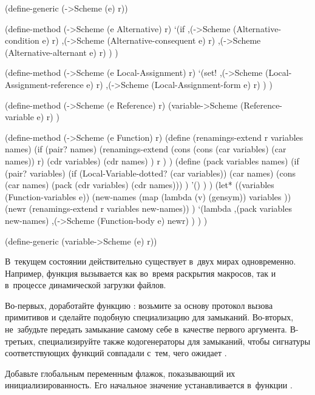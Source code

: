 \begin{code:lisp}
(define-generic (->Scheme (e) r))

(define-method (->Scheme (e Alternative) r)
  `(if ,(->Scheme (Alternative-condition e) r)
       ,(->Scheme (Alternative-consequent e) r)
       ,(->Scheme (Alternative-alternant e) r) ) )

(define-method (->Scheme (e Local-Assignment) r)
  `(set! ,(->Scheme (Local-Assignment-reference e) r)
         ,(->Scheme (Local-Assignment-form e) r) ) )

(define-method (->Scheme (e Reference) r)
  (variable->Scheme (Reference-variable e) r) )

(define-method (->Scheme (e Function) r)
  (define (renamings-extend r variables names)
    (if (pair? names)
        (renamings-extend (cons (cons (car variables) (car names)) r)
                          (cdr variables) (cdr names) )
        r ) )
  (define (pack variables names)
    (if (pair? variables)
        (if (Local-Variable-dotted? (car variables))
            (car names)
            (cons (car names) (pack (cdr variables) (cdr names))) )
        '() ) )
  (let* ((variables (Function-variables e))
         (new-names (map (lambda (v) (gensym))
                         variables ))
         (newr (renamings-extend r variables new-names)) )
    `(lambda ,(pack variables new-names)
       ,(->Scheme (Function-body e) newr) ) ) )

(define-generic (variable->Scheme (e) r))
\end{code:lisp}



В~текущем состоянии {\Meroonet} действительно существует в~двух мирах
одновременно. Например, функция  вызывается как во~время
раскрытия макросов, так и в~процессе динамической загрузки файлов.




Во-первых, доработайте функцию : возьмите за основу протокол
вызова примитивов и сделайте подобную специализацию для замыканий. Во-вторых,
не~забудьте передать замыкание самому себе в~качестве первого аргумента.
В-третьих, специализируйте также кодогенераторы для замыканий, чтобы сигнатуры
соответствующих функций совпадали с~тем, чего ожидает .



Добавьте глобальным переменным флажок, показывающий их инициализированность.
Его начальное значение устанавливается в~функции
.

